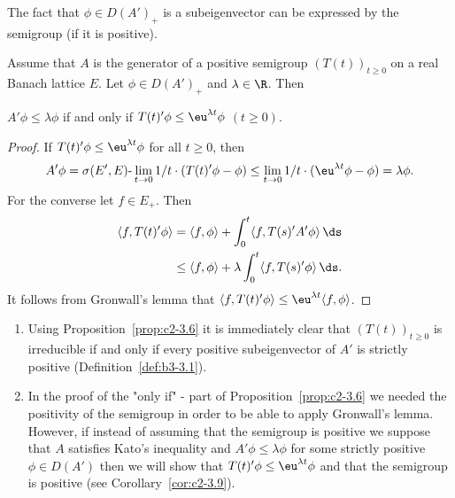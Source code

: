 The fact that $\phi \in D(A')_{+}$ is a subeigenvector can be expressed by the
semigroup (if it is positive).
\begin{proposition}\label{prop:c2-3.6}
Assume that $A$ is the generator of a positive semigroup $(T(t))_{t \geq 0}$ on a real Banach lattice $E$. 
Let $\phi \in D(A')_{+}$ and $\lambda \in \R$. 
Then
\begin{center}
$A'\phi \leq \lambda \phi$ if and only if  $T(t)'\phi \leq \eu^{\lambda t}\phi$ $(t \geq 0)$.
\end{center}
\end{proposition}
\begin{proof}
If\/ $T(t)'\phi \leq \eu^{\lambda t} \phi$ for all $t \geq 0$, then
\begin{align*}
A'\phi = \sigma(E',E)\text{-}\lim_{t \to 0} 1/t \cdot (T(t)'\phi - \phi) \leq \lim_{t \to 0} 1/t \cdot (\eu^{\lambda t}\phi - \phi) = \lambda\phi.
\end{align*}
For the converse let $f \in E_{+}$. Then
\begin{align*}
\langle f,T(t)'\phi \rangle &= \langle f,\phi \rangle + \int_{0}^{t} \langle f,T(s)'A'\phi \rangle \, \ds\\
&\leq \langle f,\phi \rangle + \lambda \int_{0}^{t} \langle f,T(s)'\phi \rangle \, \ds.
\end{align*}
It follows from Gronwall's lemma that $\langle f,T(t)'\phi \rangle \leq \eu^{\lambda t} \langle f,\phi \rangle$.
\end{proof}
\begin{remark}\label{rem:c2-3.7}
\begin{enumerate}[\upshape (i), wide, labelindent=.25em]%
\item \label{rem:c2-3.7-1}
Using Proposition~\ref{prop:c2-3.6} it is immediately clear that
$(T(t))_{t \geq 0}$ is irreducible if and only if every positive subeigenvector
of\/ $A'$ is strictly positive (\cf Definition~\ref{def:b3-3.1}). 

\item \label{rem:c2-3.7-2}
In the proof of the "only if" - part of Proposition~\ref{prop:c2-3.6} we needed the
positivity of the semigroup in order to be able to apply Gronwall's
lemma.
However, if instead of assuming that the semigroup is positive
we suppose that $A$ satisfies Kato's inequality and $A'\phi \leq \lambda\phi$ for some strictly positive $\phi \in D(A')$ then we will show that $T(t)'\phi \leq
\eu^{\lambda t} \phi$ and that the semigroup is positive (see Corollary~\ref{cor:c2-3.9}).
\end{enumerate}
\end{remark}

